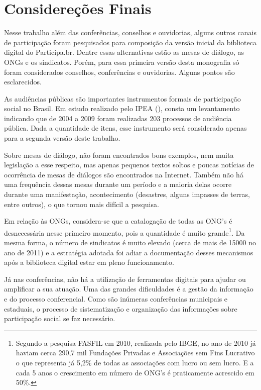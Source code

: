 \chapter{Considereções Finais}

Nesse trabalho além das conferências, conselhos e ouvidorias, alguns outros canais de participação foram pesquisados para composição da versão inicial da biblioteca digital do Participa.br. Dentre essas alternativas estão as mesas de diálogo, as ONGs e os sindicatos. Porém, para essa primeira versão desta monografia só foram considerados conselhos, conferências e ouvidorias. Alguns pontos são esclarecidos.

As audiências públicas são importantes instrumentos formais de participação social no Brasil. Em estudo realizado pelo IPEA (\citeyear{ipea2013audiencia}), consta um levantamento indicando que de 2004 a 2009 foram realizadas 203 processos de audiência pública. Dada a quantidade de itens, esse instrumento será considerado apenas para a segunda versão deste trabalho.

Sobre mesas de diálogo, não foram encontrados bons exemplos, nem muita legislação a esse respeito, mas apenas pequenos textos soltos e poucas notícias de ocorrência de mesas de diálogos são encontrados na Internet. Também não há uma frequência dessas mesas durante um período e a maioria delas ocorre durante uma manifestação, acontecimento (desastres, alguns impasses de terras, entre outros), o que tornou mais difícil a pesquisa.

Em relação às ONGs, considera-se que a catalogação de todas as ONG’s é desnecessária nesse primeiro momento, pois a quantidade é muito grande\footnote{Segundo a pesquisa FASFIL em 2010, realizada pelo IBGE, no ano de 2010 já haviam cerca 290,7 mil Fundações Privadas e Associações sem Fins Lucrativo o que representa já 5,2\% de todas as associações com lucro ou sem lucro. E a cada 5 anos o crescimento em número de ONG’s é praticamente acrescido em 50\%.}. Da mesma forma, o número de sindicatos é muito elevado (cerca de mais de 15000 no ano de 2011) e a estratégia adotada foi adiar a documentação desses mecanismos após a biblioteca digital estar em pleno funcionamento.

Já nas conferências, não há a utilização de ferramentas digitais para ajudar ou amplificar a sua atuação. Uma das grandes dificuldades é a gestão da informação e do processo conferencial. Como são inúmeras conferências municipais e estaduais, o processo de sistematização e organização das informações sobre participação social se faz necessário. 

